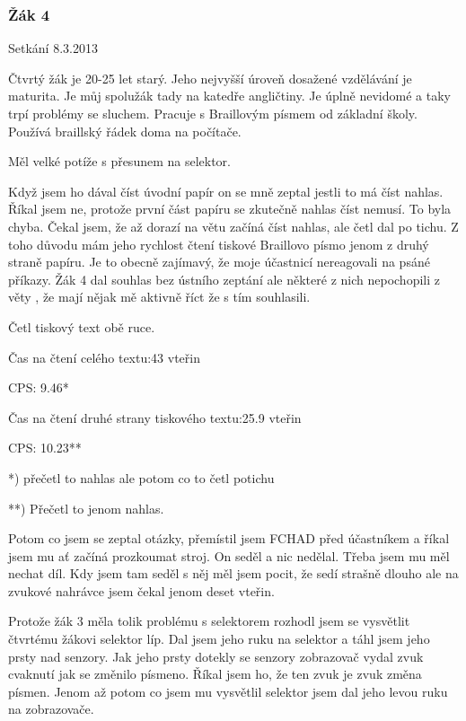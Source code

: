 \subsubsection{Žák 4}

Setkání 8.3.2013

Čtvrtý žák je 20-25 let starý.  Jeho nejvyšší úroveň dosažené vzdělávání je maturita.  Je můj spolužák tady na katedře angličtiny. Je úplně nevidomé a taky trpí problémy se sluchem.  Pracuje s Braillovým písmem od základní školy. Používá braillský řádek doma na počítače.

Měl velké potíže s přesunem na selektor.

Když jsem ho dával číst úvodní papír on se mně zeptal jestli to má číst nahlas.  Říkal jsem ne, protože první část papíru se zkutečně nahlas číst nemusí.  To byla chyba.  Čekal jsem, že až dorazí na větu  začíná číst nahlas, ale četl dal po tichu.  Z toho důvodu mám jeho rychlost čtení tiskové Braillovo písmo jenom z druhý straně papíru.  Je to obecně zajímavý, že moje účastnicí nereagovali na psáné příkazy.  Žák 4 dal souhlas bez ústního zeptání ale některé z nich nepochopili z věty , že mají nějak mě aktivně říct že s tím souhlasili.

Četl tiskový text obě ruce.

Čas na čtení celého textu:43 vteřin %

CPS: 9.46*

Čas na čtení druhé strany tiskového textu:25.9 vteřin %

CPS: 10.23**

*) přečetl to nahlas ale potom co to četl potichu

**) Přečetl to jenom nahlas.

Potom co jsem se zeptal otázky, přemístil jsem FCHAD před účastníkem a říkal jsem mu ať začíná prozkoumat stroj.  On seděl a nic nedělal.  Třeba jsem mu měl nechat díl. Kdy jsem tam seděl s něj měl jsem pocit, že sedí strašně dlouho ale na zvukové nahrávce jsem čekal jenom deset vteřin.

Protože žák 3 měla tolik problému s selektorem rozhodl jsem se vysvětlit čtvrtému žákovi selektor líp.  Dal jsem jeho ruku na selektor a táhl jsem jeho prsty nad senzory. Jak jeho prsty dotekly se senzory zobrazovač vydal zvuk cvaknutí jak se změnilo písmeno.  Říkal jsem ho, že ten zvuk je zvuk změna písmen.  Jenom až potom co jsem mu vysvětlil selektor jsem dal jeho levou ruku na zobrazovače.

